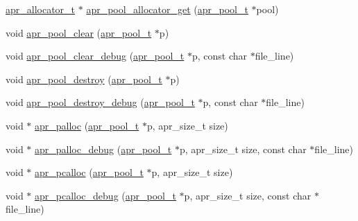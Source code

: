 \begin{DoxyCompactItemize}
\item 
\hyperlink{group__apr__allocator_ga1ceabfd30fcfc455e47d052d2a24244b}{apr\-\_\-allocator\-\_\-t} $\ast$ \hyperlink{group__apr__pools_gaf446fcf5da1fcd62d3f802a4c0c10f97}{apr\-\_\-pool\-\_\-allocator\-\_\-get} (\hyperlink{group__apr__pools_gaf137f28edcf9a086cd6bc36c20d7cdfb}{apr\-\_\-pool\-\_\-t} $\ast$pool)
\item 
void \hyperlink{group__apr__pools_gafa8a998cd660e82b62aecec09e239d0d}{apr\-\_\-pool\-\_\-clear} (\hyperlink{group__apr__pools_gaf137f28edcf9a086cd6bc36c20d7cdfb}{apr\-\_\-pool\-\_\-t} $\ast$p)
\item 
void \hyperlink{group__apr__pools_ga9521870e42ec4395a0bf8388706a57b9}{apr\-\_\-pool\-\_\-clear\-\_\-debug} (\hyperlink{group__apr__pools_gaf137f28edcf9a086cd6bc36c20d7cdfb}{apr\-\_\-pool\-\_\-t} $\ast$p, const char $\ast$file\-\_\-line)
\item 
void \hyperlink{group__apr__pools_ga54759954d2cba7cb649ab5680a33f9e3}{apr\-\_\-pool\-\_\-destroy} (\hyperlink{group__apr__pools_gaf137f28edcf9a086cd6bc36c20d7cdfb}{apr\-\_\-pool\-\_\-t} $\ast$p)
\item 
void \hyperlink{group__apr__pools_ga7efe64dfcce883d7fad9df813d9259fc}{apr\-\_\-pool\-\_\-destroy\-\_\-debug} (\hyperlink{group__apr__pools_gaf137f28edcf9a086cd6bc36c20d7cdfb}{apr\-\_\-pool\-\_\-t} $\ast$p, const char $\ast$file\-\_\-line)
\item 
void $\ast$ \hyperlink{group__apr__pools_ga85f1e193c31d109affda72f9a92c6915}{apr\-\_\-palloc} (\hyperlink{group__apr__pools_gaf137f28edcf9a086cd6bc36c20d7cdfb}{apr\-\_\-pool\-\_\-t} $\ast$p, apr\-\_\-size\-\_\-t size)
\item 
void $\ast$ \hyperlink{group__apr__pools_ga0ac211ac89be868b107776b4183a8174}{apr\-\_\-palloc\-\_\-debug} (\hyperlink{group__apr__pools_gaf137f28edcf9a086cd6bc36c20d7cdfb}{apr\-\_\-pool\-\_\-t} $\ast$p, apr\-\_\-size\-\_\-t size, const char $\ast$file\-\_\-line)
\item 
void $\ast$ \hyperlink{group__apr__pools_gaf61c098ad258069d64cdf8c0a9369f9e}{apr\-\_\-pcalloc} (\hyperlink{group__apr__pools_gaf137f28edcf9a086cd6bc36c20d7cdfb}{apr\-\_\-pool\-\_\-t} $\ast$p, apr\-\_\-size\-\_\-t size)
\item 
void $\ast$ \hyperlink{group__apr__pools_ga7b43035318ffdc57a6eddab07dc57cb2}{apr\-\_\-pcalloc\-\_\-debug} (\hyperlink{group__apr__pools_gaf137f28edcf9a086cd6bc36c20d7cdfb}{apr\-\_\-pool\-\_\-t} $\ast$p, apr\-\_\-size\-\_\-t size, const char $\ast$file\-\_\-line)
\item 

\end{DoxyCompactItemize}
